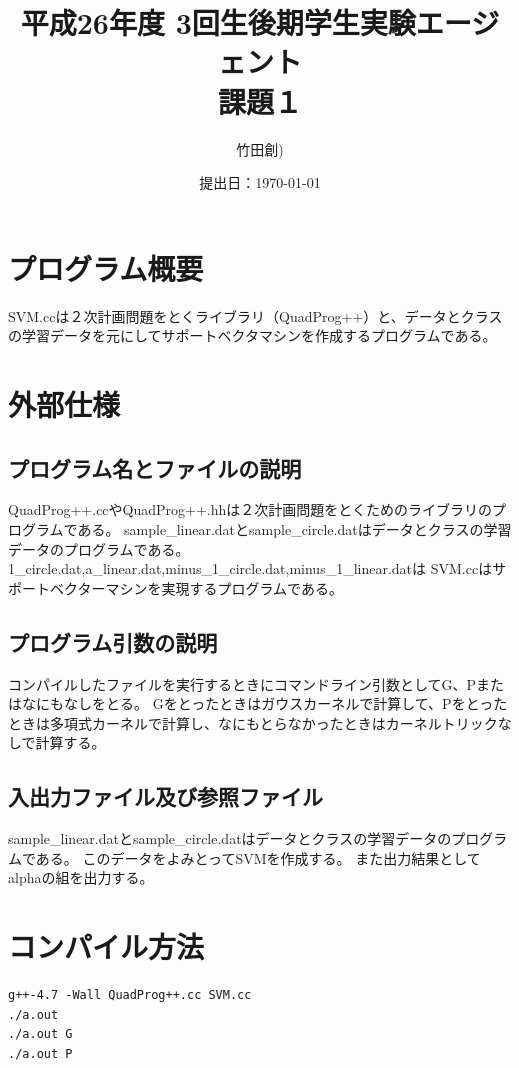 \documentclass[a4paper,12pt]{jarticle}
\title{平成26年度 3回生後期学生実験エージェント \\ 課題１}
\author{竹田創)}
\date{提出日：\today  \\ }
\begin{document}
\maketitle

\section{プログラム概要}
\lstset{numbers=left,basicstyle=\small}
SVM.ccは２次計画問題をとくライブラリ（QuadProg++）と、データとクラスの学習データを元にしてサポートベクタマシンを作成するプログラムである。
\section{外部仕様}

\subsection{プログラム名とファイルの説明}

QuadProg++.ccやQuadProg++.hhは２次計画問題をとくためのライブラリのプログラムである。
sample\_linear.datとsample\_circle.datはデータとクラスの学習データのプログラムである。
1\_circle.dat,a\_linear.dat,minus\_1\_circle.dat,minus\_1\_linear.datは
SVM.ccはサポートベクターマシンを実現するプログラムである。



\subsection{プログラム引数の説明}
コンパイルしたファイルを実行するときにコマンドライン引数としてG、Pまたはなにもなしをとる。
Gをとったときはガウスカーネルで計算して、Pをとったときは多項式カーネルで計算し、なにもとらなかったときはカーネルトリックなしで計算する。

\subsection{入出力ファイル及び参照ファイル}
sample\_linear.datとsample\_circle.datはデータとクラスの学習データのプログラムである。
このデータをよみとってSVMを作成する。
また出力結果としてalphaの組を出力する。
\section{コンパイル方法}
\begin{verbatim}
g++-4.7 -Wall QuadProg++.cc SVM.cc
./a.out 
./a.out G
./a.out P

\end{verbatim}
\end{document}
